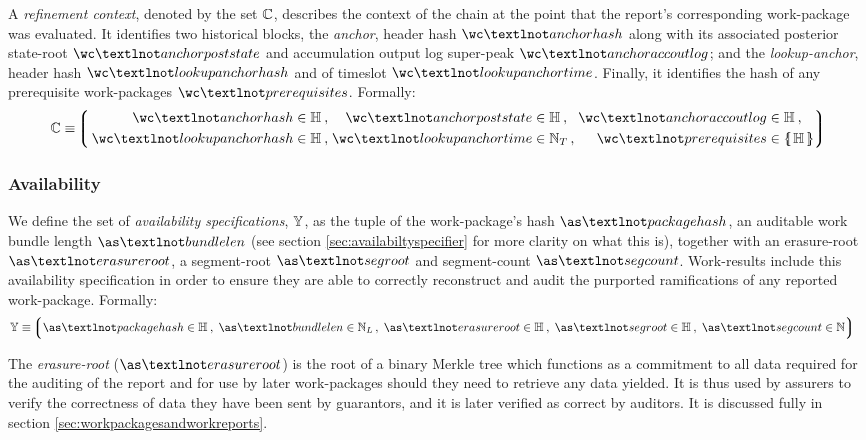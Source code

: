 A \emph{refinement context}, denoted by the set $\mathbb{C}$, describes the context of the chain at the point that the report's corresponding work-package was evaluated. It identifies two historical blocks, the \emph{anchor}, header hash $\wc¬anchorhash$ along with its associated posterior state-root $\wc¬anchorpoststate$ and accumulation output log super-peak $\wc¬anchoraccoutlog$; and the \emph{lookup-anchor}, header hash $\wc¬lookupanchorhash$ and of timeslot $\wc¬lookupanchortime$. Finally, it identifies the hash of any prerequisite work-packages $\wc¬prerequisites$. Formally:
\begin{equation}
  \label{eq:workcontext}
  \workcontext \equiv \tuple{\,\begin{alignedat}{5}
    \isa{\wc¬anchorhash&}{\hash}\,,\;
    \isa{&\wc¬anchorpoststate&}{\hash}\,,\;
    \isa{&\wc¬anchoraccoutlog&}{\hash}\,,\;\\
    \isa{\wc¬lookupanchorhash&}{\hash}\,,\;
    \isa{&\wc¬lookupanchortime&}{\timeslot}\,,\;
    \isa{&\wc¬prerequisites&}{\protoset{\hash}}
  \end{alignedat}}
\end{equation}

\subsubsection{Availability}
We define the set of \emph{availability specifications}, $\mathbb{Y}$, as the tuple of the work-package's hash $\as¬packagehash$, an auditable work bundle length $\as¬bundlelen$ (see section \ref{sec:availabiltyspecifier} for more clarity on what this is), together with an erasure-root $\as¬erasureroot$, a segment-root $\as¬segroot$ and segment-count $\as¬segcount$. Work-results include this availability specification in order to ensure they are able to correctly reconstruct and audit the purported ramifications of any reported work-package. Formally:
\begin{align}
  \label{eq:avspec}
  \avspec &\equiv \tuple{
    \isa{\as¬packagehash}{\hash}\,,\;
    \isa{\as¬bundlelen}{\bloblength}\,,\;
    \isa{\as¬erasureroot}{\hash}\,,\;
    \isa{\as¬segroot}{\hash}\,,\;
    \isa{\as¬segcount}{\N}
  }
\end{align}

The \emph{erasure-root} ($\as¬erasureroot$) is the root of a binary Merkle tree which functions as a commitment to all data required for the auditing of the report and for use by later work-packages should they need to retrieve any data yielded. It is thus used by assurers to verify the correctness of data they have been sent by guarantors, and it is later verified as correct by auditors. It is discussed fully in section \ref{sec:workpackagesandworkreports}.

